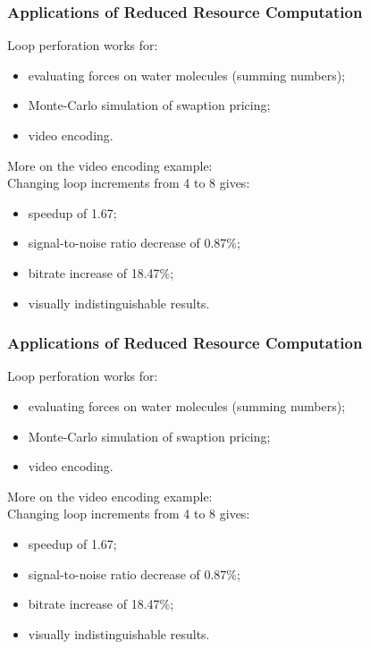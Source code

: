 \documentclass[aspectratio=43]{beamer}
\newenvironment{changemargin}[1]{%
  \begin{list}{}{%
    \setlength{\topsep}{0pt}%
    \setlength{\leftmargin}{#1}%
    \setlength{\rightmargin}{1em}
    \setlength{\listparindent}{\parindent}%
    \setlength{\itemindent}{\parindent}%
    \setlength{\parsep}{\parskip}%
  }%
  \item[]}{\end{list}}
\begin{document}
\begin{frame}
  \frametitle{Applications of Reduced Resource Computation}

\begin{changemargin}{1.5cm}
  Loop perforation works for:
  \begin{itemize}
   \item evaluating forces on water molecules (summing numbers);
   \item Monte-Carlo simulation of swaption pricing;
   \item video encoding.
  \end{itemize}

  More on the video encoding example:\\
  Changing loop increments from 4 to 8 gives:
\begin{itemize}
 \item speedup of 1.67;
 \item signal-to-noise ratio decrease of 0.87\%;
 \item bitrate increase of 18.47\%;
 \item visually indistinguishable results.
\end{itemize}
\end{changemargin}
\end{frame}


\begin{frame}
  \frametitle{Applications of Reduced Resource Computation}

\begin{changemargin}{1.5cm}
  Loop perforation works for:
  \begin{itemize}
   \item evaluating forces on water molecules (summing numbers);
   \item Monte-Carlo simulation of swaption pricing;
   \item video encoding.
  \end{itemize}

  More on the video encoding example:\\
  Changing loop increments from 4 to 8 gives:
\begin{itemize}
 \item speedup of 1.67;
 \item signal-to-noise ratio decrease of 0.87\%;
 \item bitrate increase of 18.47\%;
 \item visually indistinguishable results.
\end{itemize}
\end{changemargin}
\end{frame}
\end{document}
